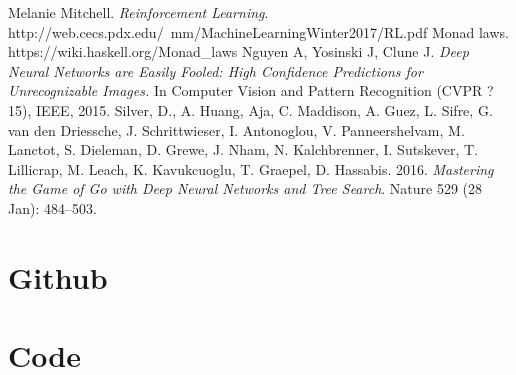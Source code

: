 \documentclass[12pt,a4paper]{article}
\begin{document}
	\pagebreak
	\begin{thebibliography}{9}
		Melanie  Mitchell.
		\textit{Reinforcement Learning}.
		http://web.cecs.pdx.edu/~mm/MachineLearningWinter2017/RL.pdf
		Monad laws.
		https://wiki.haskell.org/Monad\_laws
		Nguyen A, Yosinski J, Clune J. 
		\textit{Deep Neural Networks are Easily Fooled: High Confidence Predictions
for Unrecognizable Images.}
		In Computer Vision and Pattern Recognition (CVPR ?15), IEEE, 2015.
		Silver, D., A. Huang, Aja, C. Maddison, A. Guez, L. Sifre, G. van den Driessche, J. Schrittwieser, I. Antonoglou, V. Panneershelvam, M. Lanctot, S. Dieleman, D. Grewe, J. Nham, N. Kalchbrenner, I. Sutskever, T. Lillicrap, M. Leach, K. Kavukcuoglu, T. Graepel, D. Hassabis. 2016. \textit{Mastering the Game of Go with Deep Neural Networks and Tree Search}. Nature 529 (28 Jan): 484--503.
	\end{thebibliography}
	
	\appendix
	\section{Github}
	
	\section{Code}
	
	
            
            
\end{document}
